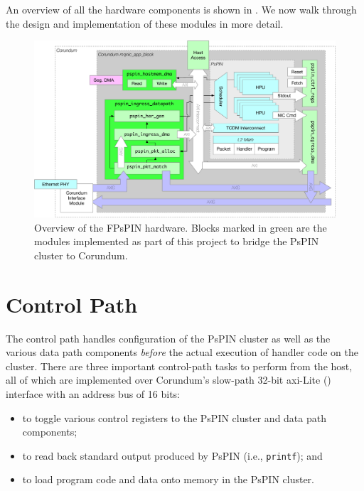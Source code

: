 An overview of all the hardware components is shown in .  We now walk through the design and implementation of these modules in more detail.

\begin{figure}
    \centering
    \includegraphics[width=\linewidth]{figures/hw-overview.pdf}
    \caption{Overview of the FPsPIN hardware.  Blocks marked in green are the modules implemented as part of this project to bridge the PsPIN cluster to Corundum.}
    \label{fig:hw-overview}
\end{figure}


\section{Control Path} \label{sec:hw-control}

The control path handles configuration of the PsPIN cluster as well as the various data path components \emph{before} the actual execution of handler code on the cluster.  There are three important control-path tasks to perform from the host, all of which are implemented over Corundum's slow-path 32-bit \ac{axi}-Lite () interface with an address bus of 16 bits:

\begin{itemize}
    \item to toggle various control registers to the PsPIN cluster and data path components;
    \item to read back standard output produced by PsPIN (i.e., \texttt{printf}); and
    \item to load program code and data onto memory in the PsPIN cluster.
\end{itemize}

